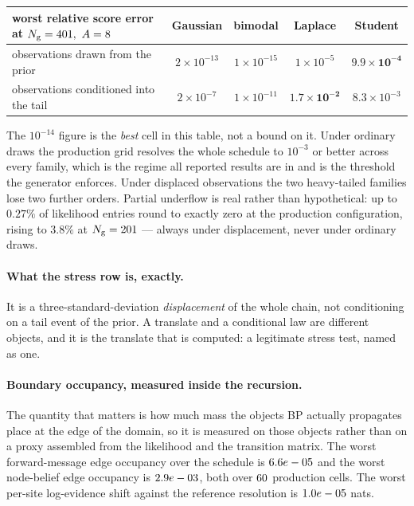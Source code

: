 \begin{center}\small
\begin{tabular}{@{}lcccc@{}}
\toprule
worst relative score error at $N_{\mathrm{g}}=401,\ A=8$
  & Gaussian & bimodal & Laplace & Student \\
\midrule
observations drawn from the prior & $2\times10^{-13}$ & $1\times10^{-15}$
  & $1\times10^{-5}$ & $\mathbf{9.9\times10^{-4}}$ \\
observations conditioned into the tail & $2\times10^{-7}$ & $1\times10^{-11}$
  & $\mathbf{1.7\times10^{-2}}$ & $8.3\times10^{-3}$ \\
\bottomrule
\end{tabular}
\end{center}

\noindent The $10^{-14}$ figure is the \emph{best} cell in this table, not a bound on it. Under
ordinary draws the production grid resolves the whole schedule to $10^{-3}$ or better across every
family, which is the regime all reported results are in and is the threshold the generator
enforces. Under displaced observations the two heavy-tailed families lose two further orders.
Partial underflow is real rather than hypothetical: up to $0.27\%$ of likelihood entries round to
exactly zero at the production configuration, rising to $3.8\%$ at $N_{\mathrm{g}}=201$ --- always under
displacement, never under ordinary draws.

\paragraph{What the stress row is, exactly.} It is a three-standard-deviation
\emph{displacement} of the whole chain, not conditioning on a tail event of the prior. A translate
and a conditional law are different objects, and it is the translate that is computed: a
legitimate stress test, named as one.

\paragraph{Boundary occupancy, measured inside the recursion.} The quantity that matters is how
much mass the objects BP actually propagates place at the edge of the domain, so it is measured on
those objects rather than on a proxy assembled from the likelihood and the transition matrix. The
worst forward-message edge occupancy over the schedule is $6.6e-05$ and the worst node-belief
edge occupancy is $2.9e-03$, both over $60$ production cells. The worst per-site
log-evidence shift against the reference resolution is $1.0e-05$ nats.

